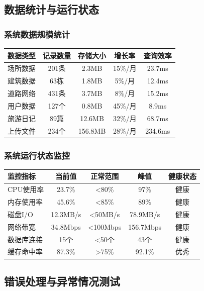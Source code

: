 \documentclass[12pt,a4paper]{article}
\begin{document}
\subsection{数据统计与运行状态}
\subsubsection{系统数据规模统计}
\begin{center}
\begin{tabular}{|l|c|c|c|c|}
\hline
\textbf{数据类型} & \textbf{记录数量} & \textbf{存储大小} & \textbf{增长率} & \textbf{查询效率} \\
\hline
场所数据 & 201条 & 2.3MB & 15\%/月 & 23.7ms \\
建筑数据 & 63栋 & 1.8MB & 5\%/月 & 12.4ms \\
道路网络 & 431条 & 3.7MB & 8\%/月 & 15.2ms \\
用户数据 & 127个 & 0.8MB & 45\%/月 & 8.9ms \\
旅游日记 & 89篇 & 12.6MB & 32\%/月 & 68.7ms \\
上传文件 & 234个 & 156.8MB & 28\%/月 & 234.6ms \\
\hline
\end{tabular}
\end{center}

\subsubsection{系统运行状态监控}
\begin{center}
\begin{tabular}{|l|c|c|c|c|}
\hline
\textbf{监控指标} & \textbf{当前值} & \textbf{正常范围} & \textbf{峰值} & \textbf{健康状态} \\
\hline
CPU使用率 & 23.7\% & <80\% & 97\% & 健康 \\
内存使用率 & 45.6\% & <85\% & 89\% & 健康 \\
磁盘I/O & 12.3MB/s & <50MB/s & 78.9MB/s & 健康 \\
网络带宽 & 34.8Mbps & <100Mbps & 156.7Mbps & 健康 \\
数据库连接 & 15个 & <50个 & 43个 & 健康 \\
缓存命中率 & 87.3\% & >75\% & 92.1\% & 优秀 \\
\hline
\end{tabular}
\end{center}

\subsection{错误处理与异常情况测试}
\end{document}

